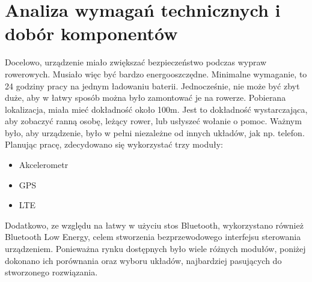\section{Analiza wymagań technicznych i dobór komponentów}
\label{sec:technical_analysis}
Docelowo, urządzenie miało zwiększać bezpieczeństwo podczas wypraw rowerowych. Musiało więc być bardzo energooszczędne. Minimalne wymaganie, to 24 godziny pracy na jednym ładowaniu baterii. Jednocześnie, nie może być zbyt duże, aby w łatwy sposób można było zamontować je na rowerze. Pobierana lokalizacja, miała mieć dokładność około 100m. Jest to dokładność wystarczająca, aby zobaczyć ranną osobę, leżący rower, lub usłyszeć wołanie o pomoc. Ważnym było, aby urządzenie, było w pełni niezależne od innych układów, jak np. telefon.
\newline
Planując pracę, zdecydowano się wykorzystać trzy moduły:
\begin{itemize}
    \item Akcelerometr
    \item GPS
    \item LTE
\end{itemize}
Dodatkowo, ze względu na łatwy w użyciu stos Bluetooth, wykorzystano również Bluetooth Low Energy, celem stworzenia bezprzewodowego interfejsu sterowania urządzeniem.
\newline
Ponieważna rynku dostępnych było wiele różnych modułów, poniżej dokonano ich porównania oraz wyboru układów, najbardziej pasujących do stworzonego rozwiązania.

